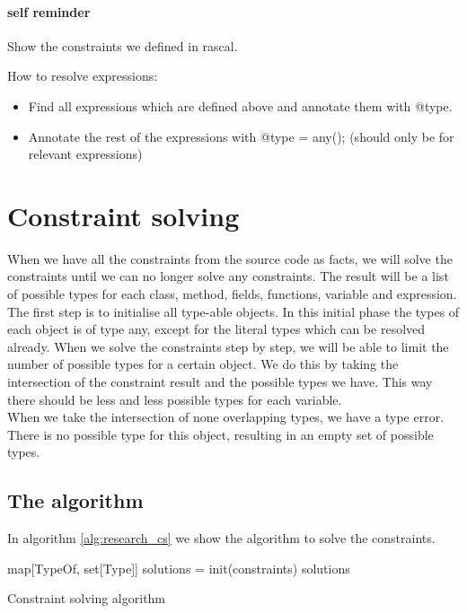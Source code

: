 \documentclass[../main.tex]{subfiles}
\begin{document}
    \paragraph{self reminder}
    Show the constraints we defined in rascal.
    
    How to resolve expressions:
    \begin{itemize}
        \item Find all expressions which are defined above and annotate them with @type.
        \item Annotate the rest of the expressions with @type = any(); (should only be for relevant expressions)
    \end{itemize}
    
    \section{Constraint solving}\label{sec:research:constraint_solving}
    When we have all the constraints from the source code as facts, we will solve the constraints until we can no longer solve any constraints.
    The result will be a list of possible types for each class, method, fields, functions, variable and expression.
    \\
    The first step is to initialise all type-able objects.
    In this initial phase the types of each object is of type any, except for the literal types which can be resolved already.
    When we solve the constraints step by step, we will be able to limit the number of possible types for a certain object.
    We do this by taking the intersection of the constraint result and the possible types we have.
    This way there should be less and less possible types for each variable.
    \\
    When we take the intersection of none overlapping types, we have a type error.
    There is no possible type for this object, resulting in an empty set of possible types.
    
    \subsection{The algorithm}
    In algorithm \ref{alg:research_cs} we show the algorithm to solve the constraints.
        
    \vspace{5 mm}
    \begin{algorithm}[H]
     \BlankLine
	 map[TypeOf, set[Type]] solutions = init(constraints)\;           \label{alg:research_cs:init_solutions}
     \BlankLine
	                                                                  \label{alg:research_cs:loop_end}
	 \BlankLine
	 \Return solutions\;     \label{alg:research_cs:return}
	 \caption{Constraint solving algorithm}
	 \label{alg:research_cs}
	\end{algorithm}
    
\end{document}
